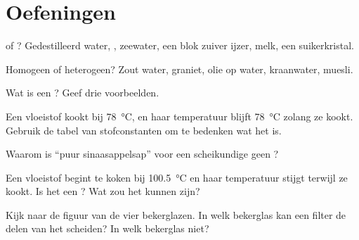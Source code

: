 \section{Oefeningen}

\begin{exercise}[$\star$]\label{exo:g6:pure-substances-and-mixtures:1}
 of ? Gedestilleerd water, , zeewater, een blok
zuiver ijzer, melk, een suikerkristal.
\end{exercise}

\begin{exercise}[$\star$]\label{exo:g6:pure-substances-and-mixtures:2}
Homogeen of heterogeen? Zout water, graniet, olie op water, kraanwater,
muesli.
\end{exercise}

\begin{exercise}[$\star$]\label{exo:g6:pure-substances-and-mixtures:3}
Wat is een ? Geef drie voorbeelden.
\end{exercise}

\begin{exercise}[$\star$]\label{exo:g6:pure-substances-and-mixtures:4}
Een vloeistof kookt bij \qty{78}{\celsius}, en haar temperatuur blijft
\qty{78}{\celsius} zolang ze kookt. Gebruik de tabel van stofconstanten
om te bedenken wat het is.
\end{exercise}

\begin{exercise}[$\star$]\label{exo:g6:pure-substances-and-mixtures:5}
Waarom is ``puur sinaasappelsap'' voor een scheikundige geen ?
\end{exercise}

\begin{exercise}[$\star\star$]\label{exo:g6:pure-substances-and-mixtures:6}
Een vloeistof begint te koken bij \qty{100.5}{\celsius} en haar
temperatuur stijgt terwijl ze kookt. Is het een ? Wat zou het
kunnen zijn?
\end{exercise}

\begin{exercise}[$\star\star$]\label{exo:g6:pure-substances-and-mixtures:7}
Kijk naar de figuur van de vier bekerglazen. In welk bekerglas kan een
filter de delen van het  scheiden? In welk bekerglas niet?
\end{exercise}

